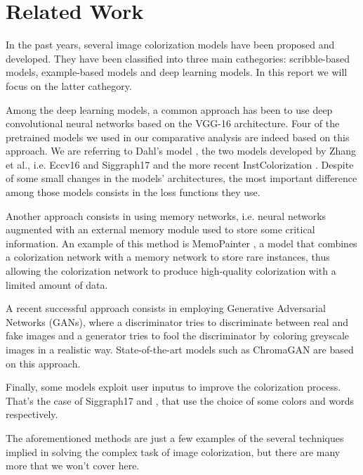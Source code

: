 \section{Related Work}
In the past years, several image colorization models have been proposed and developed. They have been classified into
three main cathegories: scribble-based models, example-based models and deep learning models. In this report we will
focus on the latter cathegory.

Among the deep learning models, a common approach has been to use deep convolutional neural networks based on the
VGG-16 architecture. Four of the pretrained models we used in our comparative analysis are indeed based on this
approach. We are referring to Dahl's model \cite{dahl}, the two models developed by Zhang et al., i.e.
Eccv16 \cite{zhang} and Siggraph17 \cite{siggraph} and the more recent InstColorization \cite{su}. Despite of some
small changes in the models' architectures, the most important difference among those models consists in the loss
functions they use.

Another approach consists in using memory networks, i.e. neural networks augmented with an external
memory module used to store some critical information. An example of this method is MemoPainter \cite{animation},
a model that combines a colorization network with a memory network to store rare instances, thus allowing the
colorization network to produce high-quality colorization with a limited amount of data.

A recent successful approach consists in employing Generative Adversarial Networks (GANs), where a discriminator
tries to discriminate between real and fake images and a generator tries to fool the discriminator by coloring
greyscale images in a realistic way. State-of-the-art models such as ChromaGAN \cite{chromagan} are based on this
approach.

Finally, some models exploit user inputus to improve the colorization process. That's the case of
Siggraph17 \cite{siggraph} and \cite{language}, that use the choice of some colors and words respectively.

The aforementioned methods are just a few examples of the several techniques implied in solving the complex task
of image colorization, but there are many more that we won't cover here.
